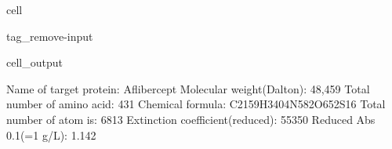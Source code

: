 \documentclass[letterpaper,10pt,english]{jupyterBook}
\begin{document}
\begin{sphinxuseclass}{cell}
\begin{sphinxuseclass}{tag_remove-input}\begin{sphinxVerbatimOutput}

\begin{sphinxuseclass}{cell_output}
\begin{sphinxVerbatim}[commandchars=\\\{\}]
\PYGZsh{} Name of target protein: \PYGZhy{}\PYGZhy{}\PYGZhy{}\PYGZhy{}\PYGZhy{}\PYGZhy{}\PYGZhy{}\PYGZhy{}\PYGZhy{}\PYGZhy{}\PYGZhy{}\PYGZhy{}\PYGZhy{}\PYGZhy{}\PYGZhy{}\PYGZhy{}\PYGZhy{}\PYGZhy{}\PYGZhy{}\PYGZhy{}\PYGZhy{}\PYGZhy{}\PYGZhy{}\PYGZhy{}\PYGZhy{}\PYGZhy{}\PYGZhy{}\PYGZhy{}\PYGZhy{}Aflibercept
\PYGZsh{} Molecular weight(Dalton): \PYGZhy{}\PYGZhy{}\PYGZhy{}\PYGZhy{}\PYGZhy{}\PYGZhy{}\PYGZhy{}\PYGZhy{}\PYGZhy{}\PYGZhy{}\PYGZhy{}\PYGZhy{}\PYGZhy{}\PYGZhy{}\PYGZhy{}\PYGZhy{}\PYGZhy{}\PYGZhy{}\PYGZhy{}\PYGZhy{}\PYGZhy{}\PYGZhy{}\PYGZhy{}\PYGZhy{}\PYGZhy{}\PYGZhy{}\PYGZhy{}\PYGZhy{}\PYGZhy{}\PYGZhy{}\PYGZhy{}\PYGZhy{}48,459
\PYGZsh{} Total number of amino acid: \PYGZhy{}\PYGZhy{}\PYGZhy{}\PYGZhy{}\PYGZhy{}\PYGZhy{}\PYGZhy{}\PYGZhy{}\PYGZhy{}\PYGZhy{}\PYGZhy{}\PYGZhy{}\PYGZhy{}\PYGZhy{}\PYGZhy{}\PYGZhy{}\PYGZhy{}\PYGZhy{}\PYGZhy{}\PYGZhy{}\PYGZhy{}\PYGZhy{}\PYGZhy{}\PYGZhy{}\PYGZhy{}\PYGZhy{}\PYGZhy{}\PYGZhy{}\PYGZhy{}\PYGZhy{}\PYGZhy{}\PYGZhy{}\PYGZhy{}431
\PYGZsh{} Chemical formula: \PYGZhy{}\PYGZhy{}\PYGZhy{}\PYGZhy{}\PYGZhy{}\PYGZhy{}\PYGZhy{}\PYGZhy{}\PYGZhy{}\PYGZhy{}\PYGZhy{}\PYGZhy{}\PYGZhy{}\PYGZhy{}\PYGZhy{}\PYGZhy{}\PYGZhy{}\PYGZhy{}\PYGZhy{}\PYGZhy{}\PYGZhy{}\PYGZhy{}\PYGZhy{}\PYGZhy{}\PYGZhy{}C2159H3404N582O652S16
\PYGZsh{} Total number of atom is: \PYGZhy{}\PYGZhy{}\PYGZhy{}\PYGZhy{}\PYGZhy{}\PYGZhy{}\PYGZhy{}\PYGZhy{}\PYGZhy{}\PYGZhy{}\PYGZhy{}\PYGZhy{}\PYGZhy{}\PYGZhy{}\PYGZhy{}\PYGZhy{}\PYGZhy{}\PYGZhy{}\PYGZhy{}\PYGZhy{}\PYGZhy{}\PYGZhy{}\PYGZhy{}\PYGZhy{}\PYGZhy{}\PYGZhy{}\PYGZhy{}\PYGZhy{}\PYGZhy{}\PYGZhy{}\PYGZhy{}\PYGZhy{}\PYGZhy{}\PYGZhy{}\PYGZhy{}6813
\PYGZsh{} Extinction coefficient(reduced): \PYGZhy{}\PYGZhy{}\PYGZhy{}\PYGZhy{}\PYGZhy{}\PYGZhy{}\PYGZhy{}\PYGZhy{}\PYGZhy{}\PYGZhy{}\PYGZhy{}\PYGZhy{}\PYGZhy{}\PYGZhy{}\PYGZhy{}\PYGZhy{}\PYGZhy{}\PYGZhy{}\PYGZhy{}\PYGZhy{}\PYGZhy{}\PYGZhy{}\PYGZhy{}\PYGZhy{}\PYGZhy{}\PYGZhy{}55350
\PYGZsh{} Reduced Abs 0.1\PYGZpc{}(=1 g/L): \PYGZhy{}\PYGZhy{}\PYGZhy{}\PYGZhy{}\PYGZhy{}\PYGZhy{}\PYGZhy{}\PYGZhy{}\PYGZhy{}\PYGZhy{}\PYGZhy{}\PYGZhy{}\PYGZhy{}\PYGZhy{}\PYGZhy{}\PYGZhy{}\PYGZhy{}\PYGZhy{}\PYGZhy{}\PYGZhy{}\PYGZhy{}\PYGZhy{}\PYGZhy{}\PYGZhy{}\PYGZhy{}\PYGZhy{}\PYGZhy{}\PYGZhy{}\PYGZhy{}\PYGZhy{}\PYGZhy{}\PYGZhy{}\PYGZhy{}1.142

\end{sphinxVerbatim}
\end{sphinxuseclass}
\end{sphinxVerbatimOutput}
\end{sphinxuseclass}
\end{sphinxuseclass}
\end{document}

